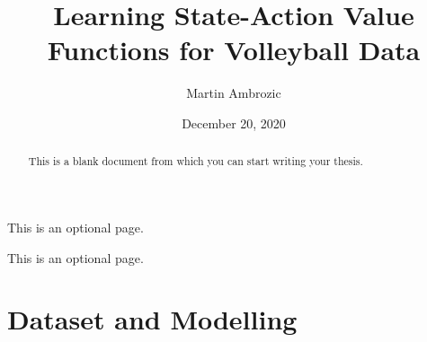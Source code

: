 \documentclass{sfuthesis}
\title{Learning State-Action Value Functions for Volleyball Data}
\author{Martin Ambrozic}
\date{December 20, 2020}
\begin{document}
	
	\frontmatter
	\maketitle{}
	\makecommittee{}
	
	\begin{abstract}
		This is a blank document from which you can start writing your thesis.
	\end{abstract}
	
	
	\begin{dedication}
		This is an optional page.
	\end{dedication}
	
	
	\begin{acknowledgements}
		This is an optional page.
	\end{acknowledgements}
	
	\tableofcontents%
	\clearpage
	
	\listoftables%
	\clearpage
	
	\listoffigures%
	\clearpage
	
	
	
	
	
	
	\mainmatter%
	
	
	
	\chapter{Dataset and Modelling}
	
\end{document}
